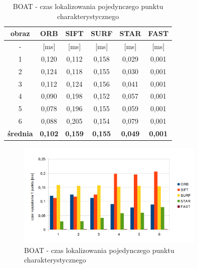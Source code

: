 \begin{table}[htbp]
  \centering
  \caption{BOAT - czas lokalizowania pojedynczego punktu charakterystycznego}
    \begin{tabular}{|c|c|c|c|c|c|}
    \hline
    obraz & \textbf{ORB} & \textbf{SIFT} & \textbf{SURF} & \textbf{STAR} & \textbf{FAST} \\
    \hline
    -  & [ms] & [ms] & [ms] & [ms] & [ms] \\\hline
   1 & 0,120 & 0,112 & 0,158 & 0,029 & 0,001 \\
    2 & 0,124 & 0,118 & 0,155 & 0,030 & 0,001 \\
    3 & 0,112 & 0,124 & 0,156 & 0,041 & 0,001 \\
    4 & 0,090 & 0,198 & 0,152 & 0,057 & 0,001 \\
    5 & 0,078 & 0,196 & 0,155 & 0,059 & 0,001 \\
    6 & 0,088 & 0,205 & 0,154 & 0,079 & 0,001 \\\hline
    \textbf{średnia} & \textbf{0,102} & \textbf{0,159} & \textbf{0,155} & \textbf{0,049} & \textbf{0,001} \\
   \hline
    \end{tabular}%
  \label{tab:boat_f2}%
\end{table}%


\begin{figure}
\centering
\includegraphics[width=0.8\textwidth]{pict/mikolajczyk/boat/f2.png}
\caption{BOAT - czas lokalizowania pojedynczego punktu charakterystycznego}
\label{fig:boat_f2}
\end{figure}

